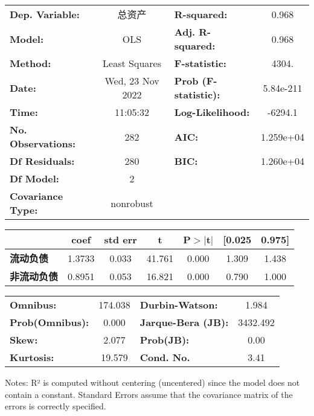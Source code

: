 \begin{center}
\begin{tabular}{lclc}
\toprule
\textbf{Dep. Variable:}    &       总资产        & \textbf{  R-squared:}      &     0.968   \\
\textbf{Model:}            &       OLS        & \textbf{  Adj. R-squared:} &     0.968   \\
\textbf{Method:}           &  Least Squares   & \textbf{  F-statistic:       }          &     4304.   \\
\textbf{Date:}             & Wed, 23 Nov 2022 & \textbf{  Prob (F-statistic):}          & 5.84e-211   \\
\textbf{Time:}             &     11:05:32     & \textbf{  Log-Likelihood:    }          &   -6294.1   \\
\textbf{No. Observations:} &         282      & \textbf{  AIC:               }          & 1.259e+04   \\
\textbf{Df Residuals:}     &         280      & \textbf{  BIC:               }          & 1.260e+04   \\
\textbf{Df Model:}         &           2      & \textbf{                     }          &             \\
\textbf{Covariance Type:}  &    nonrobust     & \textbf{                     }          &             \\
\bottomrule
\end{tabular}
\begin{tabular}{lcccccc}
               & \textbf{coef} & \textbf{std err} & \textbf{t} & \textbf{P$> |$t$|$} & \textbf{[0.025} & \textbf{0.975]}  \\
\midrule
\textbf{流动负债}  &       1.3733  &        0.033     &    41.761  &         0.000        &        1.309    &        1.438     \\
\textbf{非流动负债} &       0.8951  &        0.053     &    16.821  &         0.000        &        0.790    &        1.000     \\
\bottomrule
\end{tabular}
\begin{tabular}{lclc}
\textbf{Omnibus:}       & 174.038 & \textbf{  Durbin-Watson:     } &    1.984  \\
\textbf{Prob(Omnibus):} &   0.000 & \textbf{  Jarque-Bera (JB):  } & 3432.492  \\
\textbf{Skew:}          &   2.077 & \textbf{  Prob(JB):          } &     0.00  \\
\textbf{Kurtosis:}      &  19.579 & \textbf{  Cond. No.          } &     3.41  \\
\bottomrule
\end{tabular}
\end{center}

Notes: \newline
 [1] R² is computed without centering (uncentered) since the model does not contain a constant. \newline
 [2] Standard Errors assume that the covariance matrix of the errors is correctly specified.
